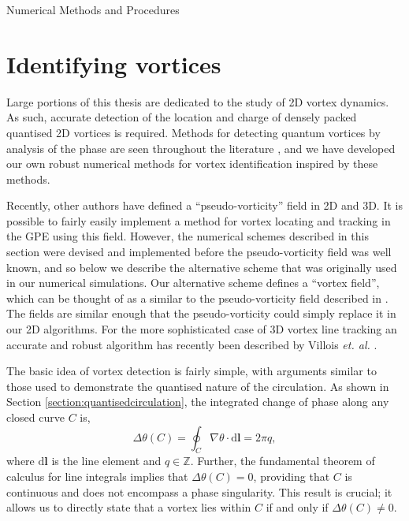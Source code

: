 \begin{chapter}{\label{cha:numerics}Numerical Methods and Procedures}
  

\section{\label{section:vortexidentifying} Identifying vortices}
Large portions of this thesis are dedicated to the study of 2D vortex dynamics. As such, accurate detection of the location and charge of densely packed quantised 2D vortices is required. Methods for detecting quantum vortices by analysis of the phase are seen throughout the literature \cite{Simula,saito10,white12,reeves_billam_13,reeves,white_anderson_14,PhysRevLett.113.165302,reeves_2015}, and we have developed our own robust numerical methods for vortex identification inspired by these methods.

Recently, other authors have defined a ``pseudo-vorticity'' field \cite{Kerr14,Villois16} in 2D and 3D. It is possible to fairly easily implement a method for vortex locating and tracking in the GPE using this field. However, the numerical schemes described in this section were devised and implemented before the pseudo-vorticity field was well known, and so below we describe the alternative scheme that was originally used in our numerical simulations. Our alternative scheme defines a ``vortex field'', which can be thought of as a similar to the pseudo-vorticity field described in \cite{Kerr14,Villois16}. The fields are similar enough that the pseudo-vorticity could simply replace it in our 2D algorithms. For the more sophisticated case of 3D vortex line tracking an accurate and robust algorithm has recently been described by Villois {\it et. al.} \cite{Villois16}.

The basic idea of vortex detection is fairly simple, with arguments similar to those used to demonstrate the quantised nature of the circulation. As shown in Section \ref{section:quantisedcirculation}, the integrated change of phase along any closed curve $C$ is,
\begin{equation}
  \Delta\theta(C) = \oint_C \! \nabla \theta  \cdot \mathrm{d}\mathbf{l} = 2\pi q,
\end{equation}
where $\mathrm{d}\mathbf{l}$ is the line element and $q\in\mathbb{Z}$. Further, the fundamental theorem of calculus for line integrals \cite{larson2013multivariable} implies that $\Delta\theta(C) = 0$, providing that $C$ is continuous and does not encompass a phase singularity. This result is crucial; it allows us to directly state that a vortex lies within $C$ if and only if $\Delta\theta(C) \neq 0 $.


\end{chapter}
